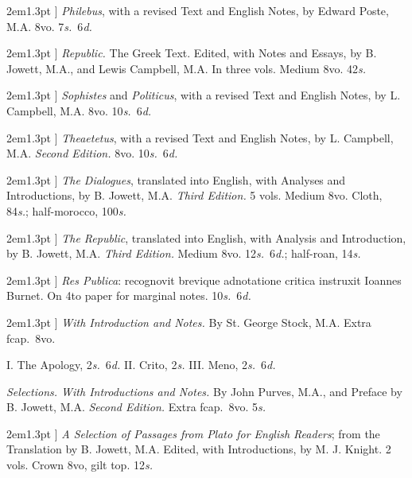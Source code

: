 \documentclass[12pt,oneside]{book}[2021/10/04]
\newcommand{\longdash}{\rule[.5ex]{2em}{1.3pt}
}
\newenvironment{advlist}{
  \begin{description}[leftmargin=1em, parsep=0.2ex, listparindent=1em,]
}{\end{description}}
\newenvironment{vollist}{
\begin{description}[nosep, topsep=-1ex, itemindent=-1em, leftmargin=2em]
}{\end{description}}
\newcommand{\¬}{\hphantom{0}}
\begin{document}
\begin{advlist}
\item[\longdash] \textit{Philebus}, with a revised
Text and English Notes, by Edward
Poste, M.A. 8vo. 7\textit{s.}\ 6\textit{d.}

\item[\longdash] \textit{Republic.} The Greek
Text. Edited, with Notes and
Essays, by B. Jowett, M.A., and
Lewis Campbell, M.A. In three
vols. Medium 8vo. 42\textit{s.}

\item[\longdash] \textit{Sophistes} and \textit{Politicus},
with a revised Text and English
Notes, by L. Campbell, M.A. 8vo.
10\textit{s.}\ 6\textit{d.}

\item[\longdash] \textit{Theaetetus}, with a revised
Text and English Notes, by L. Campbell,
M.A. \textit{Second Edition.} 8vo. 10\textit{s.}\ 6\textit{d.}

\item[\longdash] \textit{The Dialogues}, translated
into English, with Analyses
and Introductions, by B. Jowett,
M.A. \textit{Third Edition.} 5 vols. Medium
8vo. Cloth, 84\textit{s.}; half-morocco, 100\textit{s.}

\item[\longdash] \textit{The Republic}, translated
into English, with Analysis and
Introduction, by B. Jowett, M.A.
\textit{Third Edition.} Medium 8vo. 12\textit{s.}\ 6\textit{d.};
half-roan, 14\textit{s.}

\item[\longdash] \textit{Res Publica}: recognovit
brevique adnotatione critica
instruxit Ioannes Burnet. On 4to
paper for marginal notes. 10\textit{s.}\ 6\textit{d.}

\item[\longdash] \textit{With Introduction and
Notes.} By St. George Stock, M.A.
Extra fcap.\ 8vo.
\begin{vollist}
\item I. The Apology, 2\textit{s.}\ 6\textit{d.}
II. Crito, 2\textit{s.}
III. Meno, 2\textit{s.}\ 6\textit{d.}
\end{vollist}

\item[Plato.] \textit{Selections. With Introductions
and Notes.} By John Purves,
M.A., and Preface by B. Jowett,
M.A. \textit{Second Edition.} Extra fcap.\
8vo. 5\textit{s.}

\item[\longdash] \textit{A Selection of Passages
from Plato for English Readers}; from
the Translation by B. Jowett, M.A.
Edited, with Introductions, by
M. J. Knight. 2 vols. Crown 8vo,
gilt top. 12\textit{s.}


\end{advlist}
\end{document}
